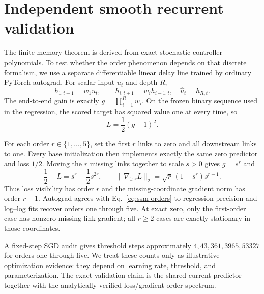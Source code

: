 \section{Independent smooth recurrent validation}
\label{sec:ssm}

The finite-memory theorem is derived from exact stochastic-controller polynomials. To test whether the order phenomenon depends on that discrete formalism, we use a separate differentiable linear delay line trained by ordinary PyTorch autograd. For scalar input $u_t$ and depth $R$,
\[
h_{1,t+1}=w_1u_t,\qquad h_{i,t+1}=w_i h_{i-1,t},\quad \hat u_t=h_{R,t}.
\]
The end-to-end gain is exactly $g=\prod_{i=1}^Rw_i$. On the frozen binary sequence used in the regression, the scored target has squared value one at every time, so
\[
L=\frac12(g-1)^2.
\]

For each order $r\in\{1,\ldots,5\}$, set the first $r$ links to zero and all downstream links to one. Every base initialization then implements exactly the same zero predictor and loss $1/2$. Moving the $r$ missing links together to scale $s>0$ gives $g=s^r$ and
\begin{equation}
\frac12-L=s^r-\frac12s^{2r},\qquad
\|\nabla_{1:r}L\|_2=\sqrt r\,(1-s^r)s^{r-1}.
\label{eq:ssm-orders}
\end{equation}
Thus loss visibility has order $r$ and the missing-coordinate gradient norm has order $r-1$. Autograd agrees with Eq.~\eqref{eq:ssm-orders} to regression precision and log--log fits recover orders one through five. At exact zero, only the first-order case has nonzero missing-link gradient; all $r\geq2$ cases are exactly stationary in those coordinates.

A fixed-step SGD audit gives threshold steps approximately $4,43,361,3965,53327$ for orders one through five. We treat these counts only as illustrative optimization evidence: they depend on learning rate, threshold, and parameterization. The exact validation claim is the shared current predictor together with the analytically verified loss/gradient order spectrum.
